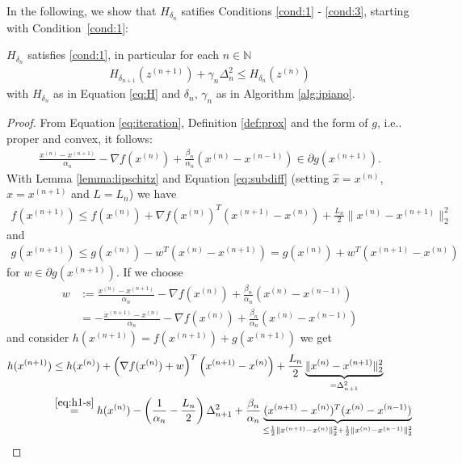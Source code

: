 \documentclass[onecolumn,final,a4paper,13pt,reqno]{siamart}
\makeatletter
\DeclareRobustCommand\onedot{\futurelet\@let@token\@onedot}
\def\@onedot{\ifx\@let@token.\else.\null\fi\xspace}
\def\ie{{i.e}\onedot} \def\Ie{{I.e}\onedot}
\makeatother
\begin{document}
In the following, we show that $H_{\delta_n}$ satifies Conditions \ref{cond:1} - \ref{cond:3}, starting with Condition~\ref{cond:1}:

\begin{lemmamd}
	$H_{\delta_n}$ satisfies \ref{cond:1}, in particular for each $n \in \mathbb{N}$
	\begin{align}
	H_{\delta_{n + 1}}(z^{(n + 1)})  + \gamma_n \Delta_n^2 \leq H_{\delta_n}(z^{(n)})\label{eq:h1}
	\end{align}
	with $H_{\delta_n}$ as in Equation \eqref{eq:H} and $\delta_n$, $\gamma_n$ as in Algorithm \ref{alg:ipiano}.\label{lemma:h1}
\end{lemmamd}

\begin{proof}
	From Equation \eqref{eq:iteration}, Definition \ref{def:prox} and the form of $g$, \ie proper and convex, it follows:
	\begin{align}
		\frac{x^{(n)} - x^{(n + 1)}}{\alpha_n} - \nabla f(x^{(n)}) + \frac{\beta_n}{\alpha_n}(x^{(n)} - x^{(n - 1)}) \in \partial g(x^{(n + 1)}).
	\end{align}
	With Lemma \ref{lemma:lipschitz} and Equation \eqref{eq:subdiff} (setting $\hat{x} = x^{(n)}$, $x = x^{(n + 1)}$ and $L = L_n$) we have
	\begin{align}
		f(x^{(n + 1)}) \leq f(x^{(n)}) + \nabla f(x^{(n)})^T(x^{(n + 1)} - x^{(n)}) + \frac{L_n}{2} \|x^{(n)} - x^{(n + 1)}\|_2^2
	\end{align}
	and
	\begin{align}
		g(x^{(n + 1)}) \leq g(x^{(n)}) - w^T (x^{(n)} - x^{(n + 1)}) = g(x^{(n)}) + w^T(x^{(n + 1)} - x^{(n)})\label{eq:h1-convex}
	\end{align}
	for $w \in \partial g(x^{(n + 1)})$. If we choose
	\begin{align}
		w &:= \frac{x^{(n)} - x^{(n + 1)}}{\alpha_n} - \nabla f(x^{(n)}) + \frac{\beta_n}{\alpha_n}(x^{(n)} - x^{(n - 1)})\\
		&= - \frac{x^{(n + 1)} - x^{(n)}}{\alpha_n} - \nabla f(x^{(n)}) + \frac{\beta_n}{\alpha_n}(x^{(n)} - x^{(n - 1)})\label{eq:h1-s}
	\end{align}
	and consider $h(x^{(n + 1)}) = f(x^{(n + 1)}) + g(x^{(n + 1)})$ we get
	\begin{align}
		h(x^{(n + 1)}) &\leq h(x^{(n)}) + \left(\nabla f(x^{(n)}) + w\right)^T\left(x^{(n + 1)} - x^{(n)}\right) + \frac{L_n}{2}\underbrace{\|x^{(n)} - x^{(n + 1)}\|_2^2}_{= \Delta_{n + 1}^2}\\
		&\overset{\eqref{eq:h1-s}}{=} h(x^{(n)}) - \left(\frac{1}{\alpha_n} - \frac{L_n}{2}\right)\Delta_{n + 1}^2 + \frac{\beta_n}{\alpha_n} \underbrace{(x^{(n + 1)} - x^{(n)})^T(x^{(n)} - x^{(n - 1)})}_{\leq \frac{1}{2}\|x^{(n + 1)} - x^{(n)}\|_2^2 + \frac{1}{2}\|x^{(n)} - x^{(n - 1)}\|_2^2}\\

\end{align}
\end{proof}
\end{document}
